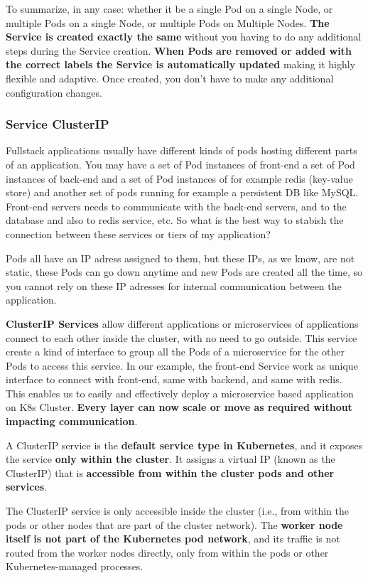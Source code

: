 \documentclass{article}
\begin{document}
To summarize, in any case: whether it be a single Pod on a single Node, or multiple Pods on a single Node, or multiple Pods on Multiple Nodes. \textbf{The Service is created exactly the same} without you having to do any additional steps during the Service creation. \textbf{When Pods are removed or added with the correct labels the Service is automatically updated} making it highly flexible and adaptive. Once created, you don't have to make any additional configuration changes.

\subsubsection{Service ClusterIP}

Fullstack applications usually have different kinds of pods hosting different parts of an application. You may have a set of Pod instances of front-end a set of Pod instances of back-end and a set of Pod instances of for example redis (key-value store) and another set of pods running for example a persistent DB like MySQL. Front-end servers needs to communicate with the back-end servers, and to the database and also to redis service, etc. So what is the best way to stabish the connection between these services or tiers of my application? 

Pods all have an IP adress assigned to them, but these IPs, as we know, are not static, these Pods can go down anytime and new Pods are created all the time, so you cannot rely on these IP adresses for internal communication between the application.

\textbf{ClusterIP Services} allow different applications or microservices of applications connect to each other inside the cluster, with no need to go outside. This service create a kind of interface to group all the Pods of a microservice for the other Pods to access this service. In our example, the front-end Service work as unique interface to connect with front-end, same with backend, and same with redis. This enables us to easily and effectively deploy a microservice based application on K8s Cluster. \textbf{Every layer can now scale or move as required without impacting communication}.

A ClusterIP service is the \textbf{default service type in Kubernetes}, and it exposes the service \textbf{only within the cluster}. It assigns a virtual IP (known as the ClusterIP) that is \textbf{accessible from within the cluster pods and other services}.

The ClusterIP service is only accessible inside the cluster (i.e., from within the pods or other nodes that are part of the cluster network). The \textbf{worker node itself is not part of the Kubernetes pod network}, and its traffic is not routed from the worker nodes directly, only from within the pods or other Kubernetes-managed processes.
\end{document}
